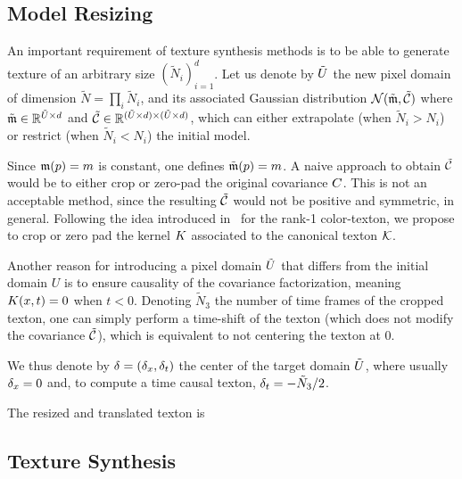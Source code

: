 \subsection{Model Resizing}

An important requirement of texture synthesis methods is to be able to generate texture of an arbitrary size $(\tilde N_i)_{i=1}^d$. Let us denote by $\tilde {U}$ the new pixel domain of dimension $\tilde N=\prod_i \tilde N_i$, and its associated Gaussian distribution $\mathcal{N}(\tilde {{\frak m}}, \tilde{\mathcal{C}})$ where $\tilde {{\frak m}} \in \mathbb{R}^{\tilde {U} \times d}$ and $\tilde {\mathcal{C}} \in \mathbb{R}^{(\tilde {U} \times d) \times (\tilde {U} \times d)}$, which can either extrapolate (when $\tilde N_i>N_i$) or restrict (when $\tilde N_i<N_i$) the initial model.


Since ${\frak m}(p) = m$ is constant, one defines $\tilde {{\frak m}}(p) = m$. A naive approach to obtain $\tilde {\mathcal{C}}$ would be to either crop or zero-pad the original covariance $C$. This is not an acceptable method, since the resulting $\tilde{\mathcal{C}}$ would not be positive and symmetric, in general. Following the idea introduced in~\cite{Desolneux-Moisan-12} for the rank-1 color-texton, we propose to crop or zero pad the kernel $K$ associated to the canonical texton $\mathcal{K}$.


Another reason for introducing a pixel domain $\tilde {U}$ that differs from the initial domain $U$ is to ensure causality of the covariance factorization, meaning $K(x,t)=0$ when $t < 0$. Denoting $\tilde N_3$ the number of time frames of the cropped texton, one can simply perform a time-shift of the texton (which does not modify the covariance $\tilde{\mathcal{C}}$), which is equivalent to not centering the texton at 0.

We thus denote by $\delta = (\delta_x,\delta_t)$ the center of the target domain $\tilde {U}$, where usually $\delta_x=0$ and, to compute a time causal texton, $\delta_t=-\tilde N_3/2$. 

\fi


The resized and translated texton is



\subsection{Texture Synthesis}

